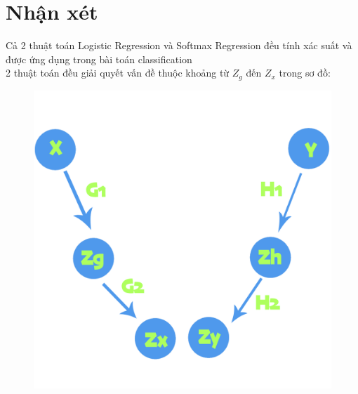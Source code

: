 \documentclass[12pt,letterpaper]{article}
\begin{document}
\section*{Nhận xét}
Cả 2 thuật toán Logistic Regression và Softmax Regression đều tính xác suất và được ứng dụng trong bài toán classification
\\ 
2 thuật toán đều giải quyết vấn đề thuộc khoảng từ $Z_g$ đến $Z_x$ trong sơ đồ: 
\begin{figure}
    \centering
    \includegraphics[width=1 \linewidth]{unifiedframework.png}
\end{figure}
\end{document}
